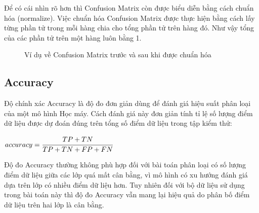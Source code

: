\documentclass[12pt,a4paper,oneside]{book}
\begin{document}
		Để có cái nhìn rõ hơn thì Confusion Matrix còn được biểu diễn bằng cách chuẩn hóa (normalize). Việc chuẩn hóa Confusion Matrix được thực hiện bằng cách lấy từng phần tử trong mỗi hàng chia cho tổng phần tử trên hàng đó. Như vậy tổng của các phần tử trên một hàng luôn bằng 1.

		\begin{figure}[H]
			\centering
			\hfill
			\caption{Ví dụ về Confusion Matrix trước và sau khi được chuẩn hóa} 
		\end{figure}

	\subsection{Accuracy}
	Độ chính xác Accuracy là độ đo đơn giản dùng để đánh giá hiệu suất phân loại của một mô hình Học máy. Cách đánh giá này đơn giản tính tỉ lệ số lượng điểm dữ liệu được dự đoán đúng trên tổng số điểm dữ liệu trong tập kiểm thử:
	
	\centerline{$accuracy = \cfrac{TP+TN}{TP+TN+FP+FN}$}
	\vspace{1em}
	Độ đo Accuracy thường không phù hợp đối với bài toán phân loại có số lượng điểm dữ liệu giữa các lớp quá mất cân bằng, vì mô hình có xu hướng đánh giá dựa trên lớp có nhiều điểm dữ liệu hơn. Tuy nhiên đối với bộ dữ liệu sử dụng trong bài toán này thì độ đo Accuracy vẫn mang lại hiệu quả do phân bố điểm dữ liệu trên hai lớp là cân bằng.
\end{document}
